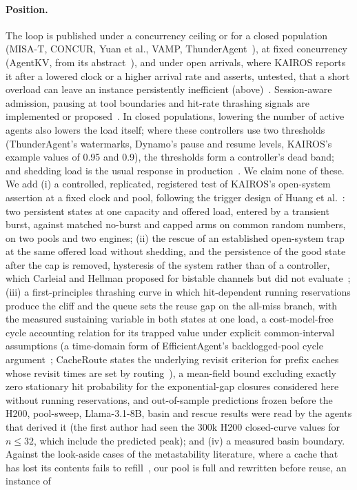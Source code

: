\paragraph{Position.} The loop is published under a concurrency ceiling or for a closed population (MISA-T, CONCUR, Yuan et al., VAMP, ThunderAgent~\citep{hong2026misat,chen2026concur,yuan2026agentic,kim2026vamp,kang2026thunderagent}), at fixed concurrency (AgentKV, from its abstract~\citep{anon2026agentkv}), and under open arrivals, where KAIROS reports it after a lowered clock or a higher arrival rate and asserts, untested, that a short overload can leave an instance persistently inefficient (above)~\citep{yuan2026kairos}. Session-aware admission, pausing at tool boundaries and hit-rate thrashing signals are implemented or proposed~\citep{kang2026thunderagent,dhanani2026dynamo,hong2026misat,chen2026concur,wang2026mars,yuan2026kairos,li2026tao,jiang2026coda}. In closed populations, lowering the number of active agents also lowers the load itself; where these controllers use two thresholds (ThunderAgent's watermarks, Dynamo's pause and resume levels, KAIROS's example values of 0.95 and 0.9), the thresholds form a controller's dead band; and shedding load is the usual response in production~\citep{huang2022metastable}. We claim none of these. We add (i) a controlled, replicated, registered test of KAIROS's open-system assertion at a fixed clock and pool, following the trigger design of Huang et al.~\citep{huang2022metastable}: two persistent states at one capacity and offered load, entered by a transient burst, against matched no-burst and capped arms on common random numbers, on two pools and two engines; (ii) the rescue of an established open-system trap at the same offered load without shedding, and the persistence of the good state after the cap is removed, hysteresis of the system rather than of a controller, which Carleial and Hellman proposed for bistable channels but did not evaluate~\citep{carleial1975bistable}; (iii) a first-principles thrashing curve in which hit-dependent running reservations produce the cliff and the queue sets the reuse gap on the all-miss branch, with the measured sustaining variable in both states at one load, a cost-model-free cycle accounting relation for its trapped value under explicit common-interval assumptions (a time-domain form of EfficientAgent's backlogged-pool cycle argument~\citep{shao2026efficientagent}; CacheRoute states the underlying revisit criterion for prefix caches whose revisit times are set by routing~\citep{cheng2026cacheroute}), a mean-field bound excluding exactly zero stationary hit probability for the exponential-gap closures considered here without running reservations, and out-of-sample predictions frozen before the H200, pool-sweep, Llama-3.1-8B, basin and rescue results were read by the agents that derived it (the first author had seen the 300k H200 closed-curve values for $n\le32$, which include the predicted peak); and (iv) a measured basin boundary. Against the look-aside cases of the metastability literature, where a cache that has lost its contents fails to refill~\citep{bronson2021metastable,huang2022metastable,farahbakhsh2026characterizing}, our pool is full and rewritten before reuse, an instance of 